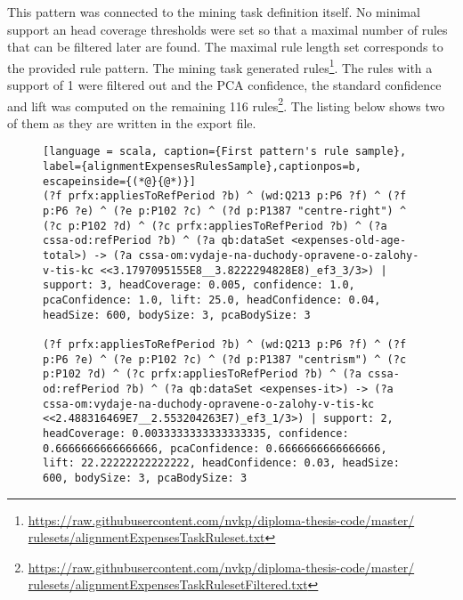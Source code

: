 This pattern was connected to the mining task definition itself. No minimal support an head coverage thresholds were set so that a maximal number of rules that can be filtered later are found. The maximal rule length set corresponds to the provided rule pattern. The mining task generated  rules\footnote{\href{https://raw.githubusercontent.com/nvkp/diploma-thesis-code/master/rulesets/alignmentExpensesTaskRuleset.txt}{https://raw.githubusercontent.com/nvkp/diploma-thesis-code/master/\\rulesets/alignmentExpensesTaskRuleset.txt}}. The rules with a support of 1 were filtered out and the PCA confidence, the standard confidence and lift was computed on the remaining 116 rules\footnote{\href{https://raw.githubusercontent.com/nvkp/diploma-thesis-code/master/rulesets/alignmentExpensesTaskRulesetFiltered.txt}{https://raw.githubusercontent.com/nvkp/diploma-thesis-code/master/\\rulesets/alignmentExpensesTaskRulesetFiltered.txt}}. The listing below shows two of them as they are written in the export file.

\begin{figure}[h]
\begin{lstlisting}[language = scala, caption={First pattern's rule sample}, label={alignmentExpensesRulesSample},captionpos=b, escapeinside={(*@}{@*)}]
(?f prfx:appliesToRefPeriod ?b) ^ (wd:Q213 p:P6 ?f) ^ (?f p:P6 ?e) ^ (?e p:P102 ?c) ^ (?d p:P1387 "centre-right") ^ (?c p:P102 ?d) ^ (?c prfx:appliesToRefPeriod ?b) ^ (?a cssa-od:refPeriod ?b) ^ (?a qb:dataSet <expenses-old-age-total>) -> (?a cssa-om:vydaje-na-duchody-opravene-o-zalohy-v-tis-kc <<3.1797095155E8__3.8222294828E8)_ef3_3/3>) | support: 3, headCoverage: 0.005, confidence: 1.0, pcaConfidence: 1.0, lift: 25.0, headConfidence: 0.04, headSize: 600, bodySize: 3, pcaBodySize: 3

(?f prfx:appliesToRefPeriod ?b) ^ (wd:Q213 p:P6 ?f) ^ (?f p:P6 ?e) ^ (?e p:P102 ?c) ^ (?d p:P1387 "centrism") ^ (?c p:P102 ?d) ^ (?c prfx:appliesToRefPeriod ?b) ^ (?a cssa-od:refPeriod ?b) ^ (?a qb:dataSet <expenses-it>) -> (?a cssa-om:vydaje-na-duchody-opravene-o-zalohy-v-tis-kc <<2.488316469E7__2.553204263E7)_ef3_1/3>) | support: 2, headCoverage: 0.0033333333333333335, confidence: 0.6666666666666666, pcaConfidence: 0.6666666666666666, lift: 22.22222222222222, headConfidence: 0.03, headSize: 600, bodySize: 3, pcaBodySize: 3
\end{lstlisting}
\end{figure}

